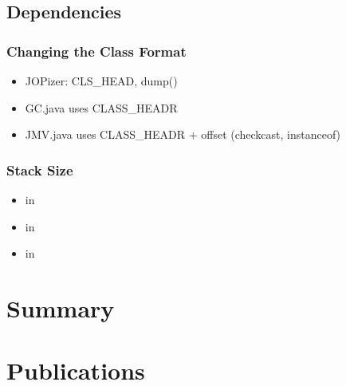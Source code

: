 

\section{Dependencies}

\subsection{Changing the Class Format}

\begin{itemize}
    \item JOPizer: CLS\_HEAD, dump()
    \item GC.java uses CLASS\_HEADR
    \item JMV.java uses CLASS\_HEADR + offset (checkcast, instanceof)
\end{itemize}

\subsection{Stack Size}

\begin{itemize}
    \item {} in 
    \item {} in 
    \item {} in 
\end{itemize}

\chapter{Summary}
\label{chap:conclusions}

    







\appendix
 \ihead{\leftmark} %

\chapter{Publications}
    

